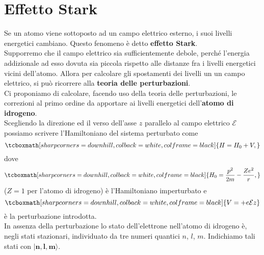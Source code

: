 \chapter[Effetto Stark]{Effetto Stark}
Se un atomo viene sottoposto ad un campo elettrico esterno, i suoi livelli energetici cambiano. Questo fenomeno è detto \textbf{effetto Stark}.\\

Supporremo che il campo elettrico sia sufficientemente debole, perché l'energia addizionale ad esso dovuta sia piccola rispetto alle distanze fra i livelli energetici vicini dell'atomo. Allora per calcolare gli spostamenti dei livelli un un campo elettrico, si può ricorrere alla \textbf{teoria delle perturbazioni}.\\

Ci proponiamo di calcolare, facendo uso della teoria delle perturbazioni, le correzioni al primo ordine da apportare ai livelli energetici dell'\textbf{atomo di idrogeno}.\\

Scegliendo la direzione ed il verso dell'asse $z$ parallelo al campo elettrico $\mathcal{E}$ possiamo scrivere l'Hamiltoniano del sistema perturbato come
	\begin{equation}
		\tcboxmath[sharp corners=downhill, colback=white, colframe=black]{
			H=H_0+V, 
			}
	\end{equation}
dove
	\begin{equation}
		\tcboxmath[sharp corners=downhill, colback=white, colframe=black]{
			H_0=\frac{p^2}{2m}-\frac{Ze^2}{r},
			}
	\end{equation}
($Z=1$ per l'atomo di idrogeno) è l'Hamiltoniano imperturbato e
	\begin{equation}
		\tcboxmath[sharp corners=downhill, colback=white, colframe=black]{
			V=+e\mathcal{E}z
			}
	\end{equation}
è la perturbazione introdotta.\\

In assenza della perturbazione lo stato dell'elettrone nell'atomo di idrogeno è, negli stati stazionari, individuato da tre numeri quantici $n$, $l$, $m$. Indichiamo tali stati con $\mathbf{|n,l,m\rangle}$.\\

